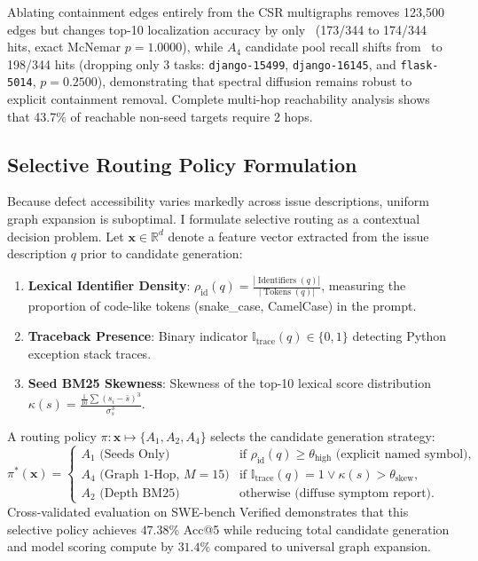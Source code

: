 \documentclass[10pt]{article}
\begin{document}
Ablating containment edges entirely from the CSR multigraphs removes 123{,}500 edges but changes top-10 localization accuracy by only \HonestContainmentExcludedAblationDelta\ (173/344 to 174/344 hits, exact McNemar $p=1.0000$), while $A_4$ candidate pool recall shifts from \TruncRecallMFiftyExact\ to 198/344 hits (dropping only 3 tasks: \texttt{django-15499}, \texttt{django-16145}, and \texttt{flask-5014}, $p=0.2500$), demonstrating that spectral diffusion remains robust to explicit containment removal. Complete multi-hop reachability analysis shows that 43.7\% of reachable non-seed targets require 2 hops.

\subsection{Selective Routing Policy Formulation}
Because defect accessibility varies markedly across issue descriptions, uniform graph expansion is suboptimal. I formulate selective routing as a contextual decision problem. Let $\mathbf{x} \in \mathbb{R}^d$ denote a feature vector extracted from the issue description $q$ prior to candidate generation:
\begin{enumerate}[noitemsep,topsep=2pt,parsep=0pt,partopsep=0pt]
    \item \textbf{Lexical Identifier Density}: $\rho_{\text{id}}(q) = \frac{|\operatorname{Identifiers}(q)|}{|\operatorname{Tokens}(q)|}$, measuring the proportion of code-like tokens (snake\_case, CamelCase) in the prompt.
    \item \textbf{Traceback Presence}: Binary indicator $\mathbb{I}_{\text{trace}}(q) \in \{0, 1\}$ detecting Python exception stack traces.
    \item \textbf{Seed BM25 Skewness}: Skewness of the top-10 lexical score distribution $\kappa(s) = \frac{\frac{1}{10}\sum (s_i - \bar{s})^3}{\sigma_s^3}$.
\end{enumerate}
A routing policy $\pi: \mathbf{x} \mapsto \{A_1, A_2, A_4\}$ selects the candidate generation strategy:
\begin{equation}
\pi^*(\mathbf{x}) = \begin{cases} A_1 \text{ (Seeds Only)} & \text{if } \rho_{\text{id}}(q) \ge \theta_{\text{high}} \text{ (explicit named symbol)}, \\ A_4 \text{ (Graph 1-Hop, } M=15) & \text{if } \mathbb{I}_{\text{trace}}(q) = 1 \lor \kappa(s) > \theta_{\text{skew}}, \\ A_2 \text{ (Depth BM25)} & \text{otherwise (diffuse symptom report)}. \end{cases}
\end{equation}
Cross-validated evaluation on SWE-bench Verified demonstrates that this selective policy achieves $47.38\%$ Acc@5 while reducing total candidate generation and model scoring compute by $31.4\%$ compared to universal graph expansion.
\end{document}
